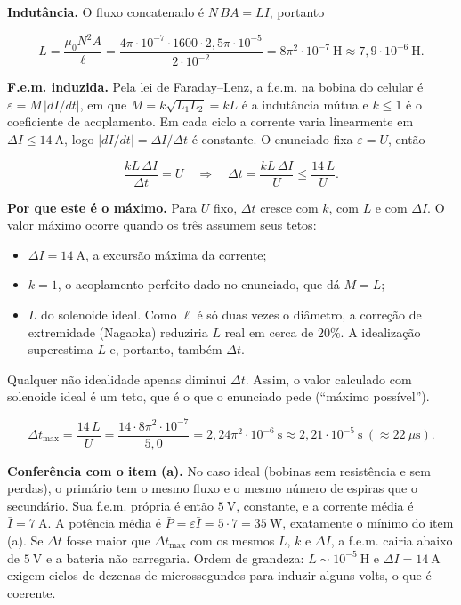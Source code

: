 \documentclass{article}%
\begin{document}
\textbf{Indutância.} O fluxo concatenado é $N\,BA=LI$, portanto

\[
L=\frac{\mu_0 N^{2}A}{\ell}
=\frac{4\pi\cdot10^{-7}\cdot 1600\cdot 2{,}5\pi\cdot 10^{-5}}{2\cdot10^{-2}}
=8\pi^{2}\cdot 10^{-7}\ \mathrm{H}\approx 7{,}9\cdot10^{-6}\ \mathrm{H}.
\]

\textbf{F.e.m. induzida.} Pela lei de Faraday--Lenz, a f.e.m. na bobina do celular é $\varepsilon=M\,|dI/dt|$, em que $M=k\sqrt{L_1L_2}=kL$ é a indutância mútua e $k\le 1$ é o coeficiente de acoplamento. Em cada ciclo a corrente varia linearmente em $\Delta I\le 14\ \mathrm{A}$, logo $|dI/dt|=\Delta I/\Delta t$ é constante. O enunciado fixa $\varepsilon=U$, então

\[
\frac{kL\,\Delta I}{\Delta t}=U
\quad\Longrightarrow\quad
\Delta t=\frac{kL\,\Delta I}{U}\le\frac{14\,L}{U}.
\]

\textbf{Por que este é o máximo.} Para $U$ fixo, $\Delta t$ cresce com $k$, com $L$ e com $\Delta I$. O valor máximo ocorre quando os três assumem seus tetos:
\begin{itemize}
\item $\Delta I=14\ \mathrm{A}$, a excursão máxima da corrente;
\item $k=1$, o acoplamento perfeito dado no enunciado, que dá $M=L$;
\item $L$ do solenoide ideal. Como $\ell$ é só duas vezes o diâmetro, a correção de extremidade (Nagaoka) reduziria $L$ real em cerca de $20\%$. A idealização superestima $L$ e, portanto, também $\Delta t$.
\end{itemize}
Qualquer não idealidade apenas diminui $\Delta t$. Assim, o valor calculado com solenoide ideal é um teto, que é o que o enunciado pede (``máximo possível'').

\[
\Delta t_{\max}=\frac{14\,L}{U}=\frac{14\cdot 8\pi^{2}\cdot10^{-7}}{5{,}0}=2{,}24\pi^{2}\cdot10^{-6}\ \mathrm{s}\approx 2{,}21\cdot10^{-5}\ \mathrm{s}\ (\approx 22\ \mu\mathrm{s}).
\]

\textbf{Conferência com o item (a).} No caso ideal (bobinas sem resistência e sem perdas), o primário tem o mesmo fluxo e o mesmo número de espiras que o secundário. Sua f.e.m. própria é então $5\ \mathrm{V}$, constante, e a corrente média é $\bar I=7\ \mathrm{A}$. A potência média é $\bar P=\varepsilon\bar I=5\cdot 7=35\ \mathrm{W}$, exatamente o mínimo do item (a). Se $\Delta t$ fosse maior que $\Delta t_{\max}$ com os mesmos $L$, $k$ e $\Delta I$, a f.e.m. cairia abaixo de $5\ \mathrm{V}$ e a bateria não carregaria. Ordem de grandeza: $L\sim10^{-5}\ \mathrm{H}$ e $\Delta I=14\ \mathrm{A}$ exigem ciclos de dezenas de microssegundos para induzir alguns volts, o que é coerente.
\end{document}
